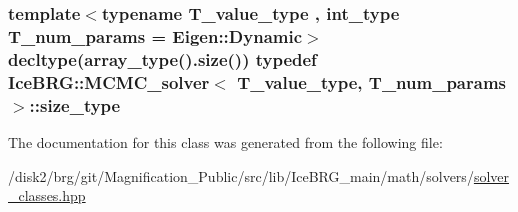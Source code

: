 \subsubsection[{size\+\_\+type}]{\setlength{\rightskip}{0pt plus 5cm}template$<$typename T\+\_\+value\+\_\+type , int\+\_\+type T\+\_\+num\+\_\+params = Eigen\+::\+Dynamic$>$ decltype({\bf array\+\_\+type}().size()) typedef {\bf Ice\+B\+R\+G\+::\+M\+C\+M\+C\+\_\+solver}$<$ T\+\_\+value\+\_\+type, T\+\_\+num\+\_\+params $>$\+::{\bf size\+\_\+type}}\label{classIceBRG_1_1MCMC__solver_ae03c5e41621464a1bfcc7aac7cace475}


The documentation for this class was generated from the following file\+:\begin{DoxyCompactItemize}
\item 
/disk2/brg/git/\+Magnification\+\_\+\+Public/src/lib/\+Ice\+B\+R\+G\+\_\+main/math/solvers/\hyperlink{solver__classes_8hpp}{solver\+\_\+classes.\+hpp}\end{DoxyCompactItemize}
